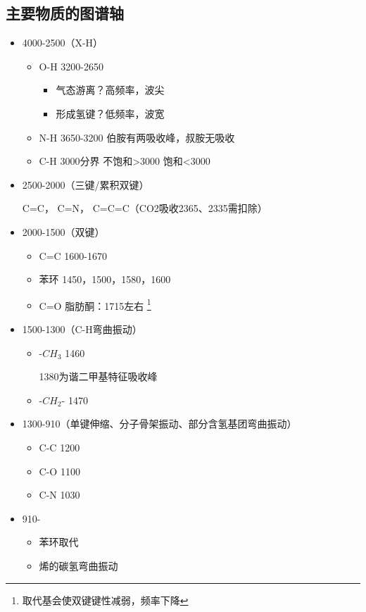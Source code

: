 \subsection{主要物质的图谱轴}
\begin{itemize}
    \item 4000-2500（X-H）
    \begin{itemize}
        \item O-H	3200-2650
        \begin{itemize}
            \item 气态游离？高频率，波尖
            \item 形成氢键？低频率，波宽
        \end{itemize}
        \item N-H	3650-3200	伯胺有两吸收峰，叔胺无吸收
        \item C-H	3000分界	不饱和>3000 饱和<3000
    \end{itemize}
    \item 2500-2000（三键/累积双键）
    \begin{example}
        C=C， C=N， C=C=C（CO2吸收2365、2335需扣除）
    \end{example}
    \item 2000-1500（双键）
    \begin{itemize}
        \item C=C	1600-1670
        \item 苯环	1450，1500，1580，1600
        \item C=O	脂肪酮：1715左右
        \footnote{取代基会使双键键性减弱，频率下降}
    \end{itemize}
    \item 1500-1300（C-H弯曲振动）
    \begin{itemize}
        \item -$CH_{3}$	1460
        \begin{note}
            1380为谐二甲基特征吸收峰
        \end{note}
        \item -$CH_{2}$-	1470
    \end{itemize}
    \item 1300-910（单键伸缩、分子骨架振动、部分含氢基团弯曲振动）
    \begin{itemize}
        \item C-C	1200
		\item C-O	1100
		\item C-N	1030
    \end{itemize}
    \item 910-
    \begin{itemize}
        \item 苯环取代
        \item 烯的碳氢弯曲振动
    \end{itemize}
\end{itemize}

